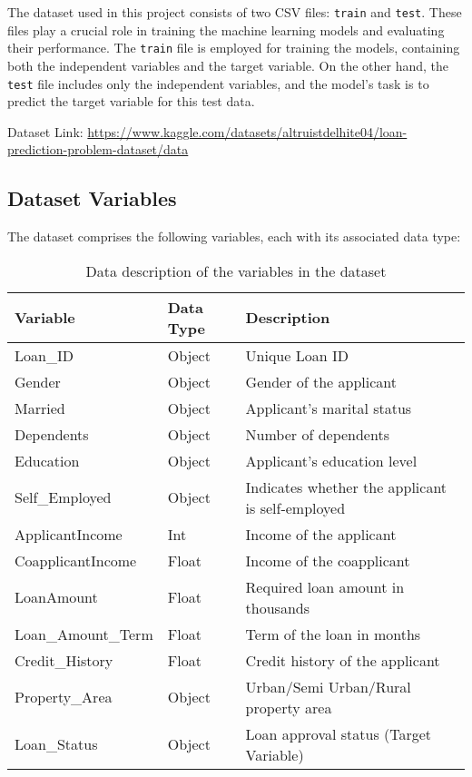 \documentclass[10pt]{article}
\begin{document}
The dataset used in this project consists of two CSV files: \texttt{train} and \texttt{test}. These files play a crucial role in training the machine learning models and evaluating their performance. The \texttt{train} file is employed for training the models, containing both the independent variables and the target variable. On the other hand, the \texttt{test} file includes only the independent variables, and the model's task is to predict the target variable for this test data.

Dataset Link: \url{https://www.kaggle.com/datasets/altruistdelhite04/loan-prediction-problem-dataset/data}

\subsection*{Dataset Variables}

The dataset comprises the following variables, each with its associated data type:
\begin{table}[h]
    \centering
    \begin{tabular}{|l|l|p{6cm}|}
        \hline
        \textbf{Variable} & \textbf{Data Type} & \textbf{Description} \\
        \hline
        Loan\_ID & Object & Unique Loan ID \\
        Gender & Object & Gender of the applicant \\
        Married & Object & Applicant's marital status \\
        Dependents & Object & Number of dependents \\
        Education & Object & Applicant's education level \\
        Self\_Employed & Object & Indicates whether the applicant is self-employed \\
        ApplicantIncome & Int & Income of the applicant \\
        CoapplicantIncome & Float & Income of the coapplicant \\
        LoanAmount & Float & Required loan amount in thousands \\
        Loan\_Amount\_Term & Float & Term of the loan in months \\
        Credit\_History & Float & Credit history of the applicant \\
        Property\_Area & Object & Urban/Semi Urban/Rural property area \\
        Loan\_Status & Object & Loan approval status (Target Variable) \\
        \hline
    \end{tabular}
    \caption{Data description of the variables in the dataset}
    \label{tab:description}
\end{table}
\end{document}
